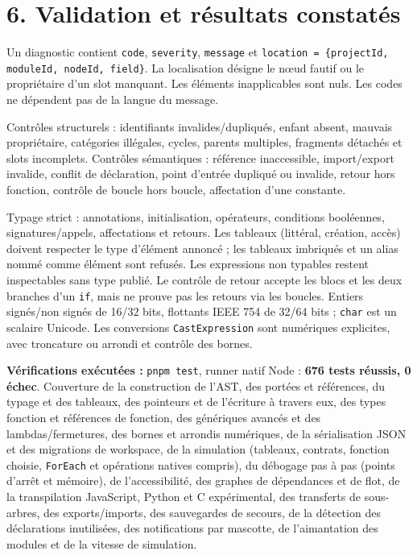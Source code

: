 \documentclass[11pt,a4paper]{article}
\newcommand{\code}[1]{\texttt{#1}}
\newcommand{\chaptertitle}[2]{\noindent{\small\sffamily SAPPHIRE 3 --- FONDATIONS LOGIQUES\hfill #1/4}\par\vspace{4mm}{\LARGE\sffamily\bfseries #2}\par\vspace{3mm}}
\begin{document}
\newpage
\chaptertitle{4}{Vérification et évolutivité}
\section*{6. Validation et résultats constatés}
Un diagnostic contient \code{code}, \code{severity}, \code{message} et
\code{location = \{projectId, moduleId, nodeId, field\}}. La localisation
désigne le nœud fautif ou le propriétaire d'un slot manquant. Les éléments
inapplicables sont nuls. Les codes ne dépendent pas de la langue du message.

Contrôles structurels : identifiants invalides/dupliqués, enfant absent,
mauvais propriétaire, catégories illégales, cycles, parents multiples,
fragments détachés et slots incomplets. Contrôles sémantiques : référence
inaccessible, import/export invalide, conflit de déclaration, point d'entrée
dupliqué ou invalide, retour hors fonction, contrôle de boucle hors boucle,
affectation d'une constante.

Typage strict : annotations, initialisation, opérateurs, conditions booléennes,
signatures/appels, affectations et retours. Les tableaux (littéral, création,
accès) doivent respecter le type d'élément annoncé ; les tableaux imbriqués et
un alias nommé comme élément sont refusés. Les expressions non typables restent
inspectables sans type publié. Le contrôle de retour accepte les blocs et les
deux branches d'un \code{if}, mais ne prouve pas les retours via les boucles.
Entiers signés/non signés de 16/32 bits, flottants IEEE 754 de 32/64 bits ;
\code{char} est un scalaire Unicode. Les conversions \code{CastExpression}
sont numériques explicites, avec troncature ou arrondi et contrôle des bornes.

\textbf{Vérifications exécutées :} \code{pnpm test}, runner natif Node :
\textbf{676 tests réussis, 0 échec}. Couverture de la construction de l'AST,
des portées et références, du typage et des tableaux, des pointeurs et de
l'écriture à travers eux, des types fonction et références de fonction, des
génériques avancés et des lambdas/fermetures, des bornes et arrondis numériques,
de la sérialisation JSON et des migrations de workspace, de la simulation
(tableaux, contrats, fonction choisie, \code{ForEach} et opérations natives
compris), du débogage pas à pas (points d'arrêt et mémoire), de l'accessibilité,
des graphes de dépendances et de flot, de la transpilation JavaScript, Python et C expérimental,
des transferts de sous-arbres, des exports/imports, des sauvegardes de secours,
de la détection des déclarations inutilisées, des notifications par mascotte,
de l'aimantation des modules et de la vitesse de simulation.
\end{document}
